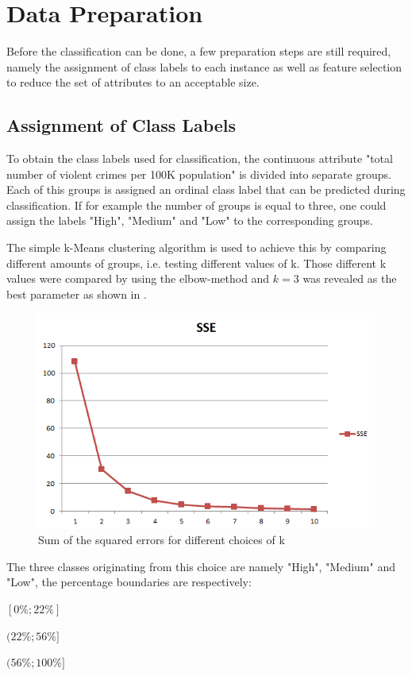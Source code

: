 \section{Data Preparation}

Before the classification can be done, a few preparation steps are still
required, namely the assignment of class labels to each instance as
well as feature selection to reduce the set of attributes to an
acceptable size.

\subsection{Assignment of Class Labels}
\label{sec:assignment}

To obtain the class labels used for classification, the
continuous attribute "total number of violent crimes per 100K
population" is divided into separate groups. Each of this groups is
assigned an ordinal class label that can be predicted during classification.
If for example the number of groups is equal to three, one could
assign the labels "High", "Medium" and "Low" to the corresponding
groups.

The simple k-Means clustering algorithm is used to achieve this
by comparing different amounts of groups, i.e. testing
different values of k. Those different k values were compared by using
the elbow-method and \(k=3\) was revealed as the best parameter as
shown in .
\begin{figure}[H]
  \centering
  \includegraphics[width=\columnwidth]{../../charts/SSE.png}
  \caption{Sum of the squared errors for different choices of k}
  \label{fig:sse}
\end{figure}
The three classes originating from this choice are namely
"High", "Medium" and "Low", the percentage boundaries are
respectively:
\begin{description}
  \setlength{\itemsep}{-2pt}
\item[Low:] \([0\%; 22\%]\) 
\item[Medium:] \((22\%; 56\%]\)
\item[High:] \((56\%; 100\%]\)
\end{description}

